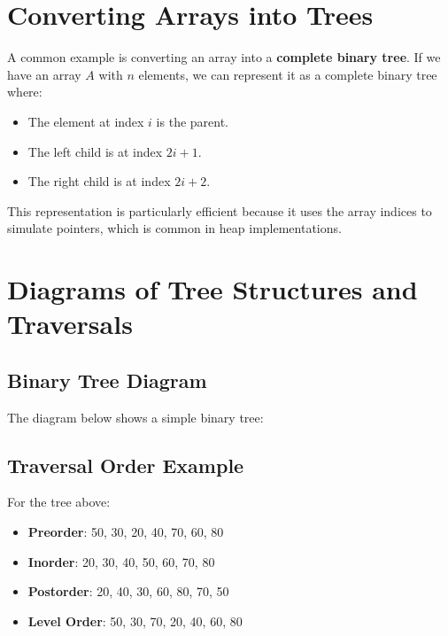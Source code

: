 \section{Converting Arrays into Trees}
A common example is converting an array into a \textbf{complete binary tree}. If we have an array \( A \) with \( n \) elements, we can represent it as a complete binary tree where:
\begin{itemize}
    \item The element at index \( i \) is the parent.
    \item The left child is at index \( 2i+1 \).
    \item The right child is at index \( 2i+2 \).
\end{itemize}
This representation is particularly efficient because it uses the array indices to simulate pointers, which is common in heap implementations.

\section{Diagrams of Tree Structures and Traversals}
\subsection{Binary Tree Diagram}
The diagram below shows a simple binary tree:

\begin{center}
\end{center}

\subsection{Traversal Order Example}
For the tree above:
\begin{itemize}
    \item \textbf{Preorder}: 50, 30, 20, 40, 70, 60, 80
    \item \textbf{Inorder}: 20, 30, 40, 50, 60, 70, 80
    \item \textbf{Postorder}: 20, 40, 30, 60, 80, 70, 50
    \item \textbf{Level Order}: 50, 30, 70, 20, 40, 60, 80
\end{itemize}

